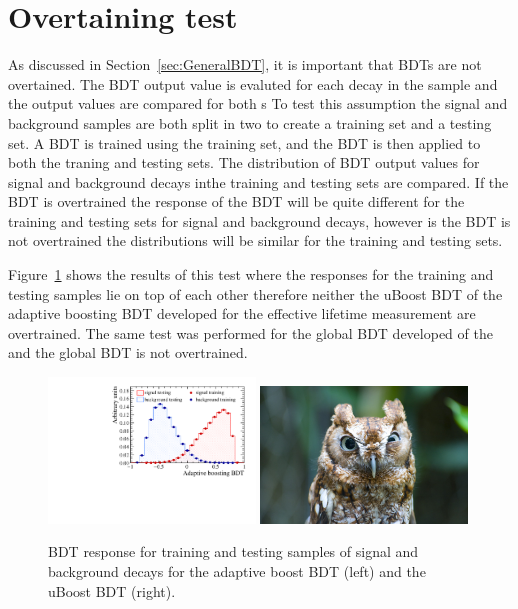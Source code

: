 \section{Overtaining test}
As discussed in Section~\ref{sec:GeneralBDT}, it is important that BDTs are not overtained. %
The BDT output value is evaluted for each decay in the sample and the output values are compared for both s
To test this assumption the signal and background samples are both split in two to create a training set and a testing set.
A BDT is trained using the training set, and the BDT is then applied to both the traning and testing sets. The distribution of BDT output values for signal and background decays inthe training and testing sets are compared. If the BDT is overtrained the response of the BDT will be quite different for the training and testing sets for signal and background decays, however is the BDT is not overtrained the distributions will be similar for the training and testing sets. 

Figure~\ref{fig:ELBDTovertrain} shows the results of this test where the responses for the training and testing samples lie on top of each other therefore neither the uBoost BDT of the adaptive boosting BDT developed for the effective lifetime measurement are overtrained. The same test was performed for the global BDT developed of the \BFm and the global BDT is not overtrained.  

\begin{figure}[htbp]
   \centering
        \includegraphics[width=0.49\textwidth]{./Figs/Appendix2/Overtainting_BDT.pdf}
        \includegraphics[width=0.49\textwidth]{./Figs/placeholder.jpeg}

    \caption{BDT response for training and testing samples of signal and background decays for the adaptive boost BDT (left) and the uBoost BDT (right). }
    \label{fig:ELBDTovertrain}
\end{figure}



